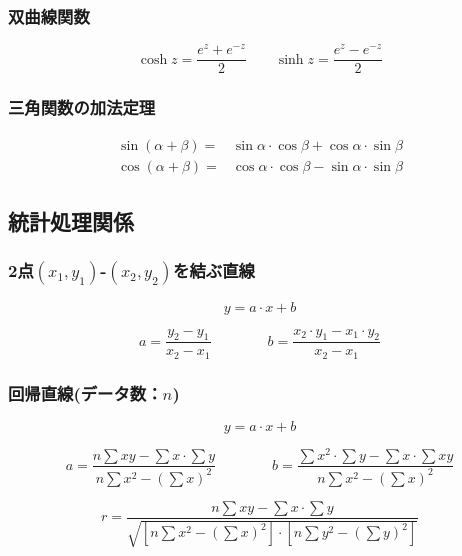 \documentclass[a4paper,10pt]{jsarticle}
\begin{document}
\subsubsection{双曲線関数}
\begin{equation}
\cosh z=\frac{e^z+e^{-z}}{2} \qquad \sinh z=\frac{e^z-e^{-z}}{2}
\end{equation}


\subsubsection{三角関数の加法定理}
\begin{align}
\sin(\alpha+\beta)=&\sin\alpha\cdot\cos\beta+\cos\alpha\cdot\sin\beta \\
\cos(\alpha+\beta)=&\cos\alpha\cdot\cos\beta-\sin\alpha\cdot\sin\beta
\end{align}



\subsection{統計処理関係}
\subsubsection{2点$(x_1,y_1)$-$(x_2,y_2)$を結ぶ直線}
\begin{equation}
y=a\cdot x+b
\end{equation}

\begin{equation}
a=\frac{y_2-y_1}{x_2-x_1}
 \qquad \qquad
b=\frac{x_2\cdot y_1-x_1\cdot y_2}{x_2-x_1}
\end{equation}


\subsubsection{回帰直線(データ数：$n$)}
\begin{equation}
y=a\cdot x+b
\end{equation}

\begin{equation}
a=\frac{n \sum xy-\sum x\cdot\sum y}{n \sum x^2-(\sum x)^2}
 \qquad \qquad
b=\frac{\sum x^2\cdot \sum y-\sum x\cdot\sum xy}{n \sum x^2-(\sum x)^2}
\end{equation}

\begin{equation}
r=\frac{n \sum xy-\sum x\cdot\sum y}{\sqrt{[n \sum x^2-(\sum x)^2]\cdot [n \sum y^2-(\sum y)^2]}}
\end{equation}
\end{document}
